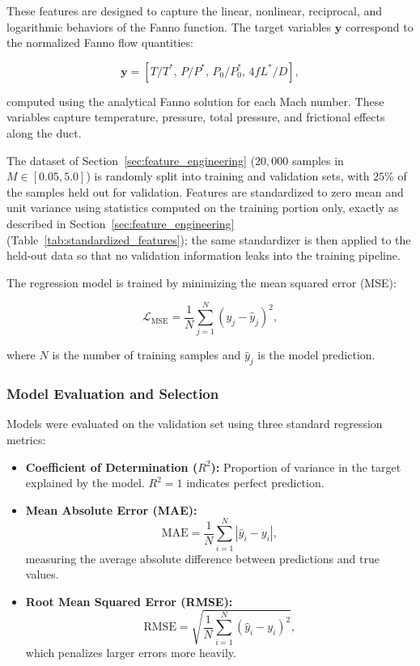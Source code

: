 \documentclass[11pt,a4paper]{report}
\begin{document}
These features are designed to capture the linear, nonlinear, reciprocal, and logarithmic behaviors of the Fanno function. The target variables $\mathbf{y}$ correspond to the normalized Fanno flow quantities:

\begin{equation}
\mathbf{y} = [T/T^*, \, P/P^*, \, P_0/P_0^*, \, 4fL^*/D],
\end{equation}

computed using the analytical Fanno solution for each Mach number. These variables capture temperature, pressure, total pressure, and frictional effects along the duct.  

The dataset of Section~\ref{sec:feature_engineering} ($20{,}000$ samples in $M \in [0.05, 5.0]$) is randomly split into training and validation sets, with $25\%$ of the samples held out for validation. Features are standardized to zero mean and unit variance using statistics computed on the training portion only, exactly as described in Section~\ref{sec:feature_engineering} (Table~\ref{tab:standardized_features}); the same standardizer is then applied to the held-out data so that no validation information leaks into the training pipeline.

The regression model is trained by minimizing the mean squared error (MSE):

\begin{equation}
\mathcal{L}_\text{MSE} = \frac{1}{N} \sum_{j=1}^{N} \left( y_j - \hat{y}_j \right)^2,
\end{equation}

where $N$ is the number of training samples and $\hat{y}_j$ is the model prediction.


\subsubsection{Model Evaluation and Selection}
Models were evaluated on the validation set using three standard regression metrics:

\begin{itemize}
    \item \textbf{Coefficient of Determination ($R^2$):} Proportion of variance in the target explained by the model. $R^2 = 1$ indicates perfect prediction.
    \item \textbf{Mean Absolute Error (MAE):} 
    \begin{equation}
        \text{MAE} = \frac{1}{N} \sum_{i=1}^{N} \left| \hat{y}_i - y_i \right|,
    \end{equation}
    measuring the average absolute difference between predictions and true values.
    \item \textbf{Root Mean Squared Error (RMSE):} 
    \begin{equation}
        \text{RMSE} = \sqrt{\frac{1}{N} \sum_{i=1}^{N} (\hat{y}_i - y_i)^2},
    \end{equation}
    which penalizes larger errors more heavily.
\end{itemize}
\end{document}

